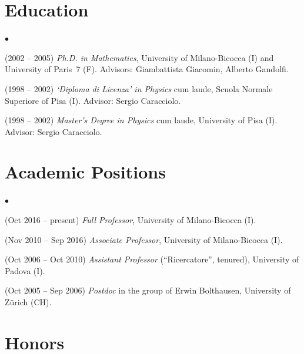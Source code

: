 \documentclass[a4paper,11pt,oneside]{amsart}
\newenvironment{myitemize}{%
\begin{list}{$\bullet$}%
 	{%
	\setlength{\itemsep}{0.3em}%
	\setlength{\topsep}{0.3em}%
	\setlength{\partopsep}{0em}%
	\setlength{\parsep}{0em}%
	\setlength{\parskip}{0em}%
	\setlength\leftmargin{1.5em}%
	\setlength\labelwidth{1.1em}%
	\setlength{\labelsep}{0.4em}%
	}%
	}%
{\end{list}}
\renewenvironment{itemize}{
\begin{myitemize}}%
{\end{myitemize}}
\begin{document}
\section{Education}

\begin{itemize}
\item
(2002 -- 2005)
\emph{Ph.D. in Mathematics}, University of Milano-Bicocca (I)
and University of Paris~7 (F). Advisors: Giambattista Giacomin,
Alberto Gandolfi.

\item
(1998 -- 2002) \emph{`Diploma di Licenza' in Physics} cum laude, %
Scuola Normale Superiore of Pisa (I). Advisor: Sergio Caracciolo.

\item
(1998 -- 2002) 
\emph{Master's Degree in Physics} cum laude, %
University of Pisa (I). Advisor: Sergio Caracciolo.
\end{itemize}

\section{Academic Positions}

\begin{itemize}
\item (Oct 2016 -- present) \emph{Full Professor},
University of Milano-Bicocca (I).

\item (Nov 2010 -- Sep 2016) \emph{Associate Professor},
University of Milano-Bicocca (I).

\item (Oct 2006 -- Oct 2010) \emph{Assistant Professor}  (``Ricercatore'', tenured),
University of Padova (I).

\item (Oct 2005 -- Sep 2006) \emph{Postdoc}
in the group of Erwin Bolthausen, 
University of Z\"urich (CH).
\end{itemize}

\section{Honors}
\end{document}
